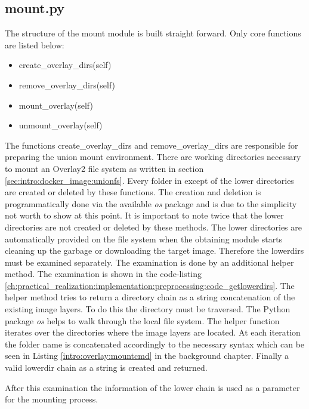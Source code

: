 \subsection{mount.py}	
\label{ch:practical_realization:implementation:mount}
The structure of the mount module is built straight forward. Only core functions are listed below:
\begin{itemize}
\item create\_overlay\_dirs(self)
\item remove\_overlay\_dirs(self)
\item mount\_overlay(self)
\item unmount\_overlay(self)
\end{itemize}
The functions create\_overlay\_dirs and remove\_overlay\_dirs are responsible for preparing the union mount environment. There are working directories necessary to mount an Overlay2 file system as written in section \ref{sec:intro:docker_image:unionfs}.
Every folder in except of the lower directories are created or deleted by these functions. 
The creation and deletion is programmatically done via the available \textit{os} package and is due to the simplicity not worth to show at this point. It is important to note twice that the lower directories are not created or deleted by these methods. 
The lower directories are automatically provided on the file system when the obtaining module starts cleaning up the garbage or downloading the target image.
Therefore the lowerdirs must be examined separately. The examination is done by an additional helper method. 
The examination is shown in the code-listing \ref{ch:practical_realization:implementation:preprocessing:code_getlowerdirs}.
The helper method tries to return a directory chain as a string concatenation of the existing image layers.
To do this the directory must be traversed. The Python package \textit{os} helps to walk through the local file system. The helper function iterates over the directories where the image layers are located.
At each iteration the folder name is concatenated accordingly to the necessary syntax which can be seen in Listing \ref{intro:overlay:mountcmd} in the background chapter. Finally a valid lowerdir chain as a string is created and returned.

After this examination the information of the lower chain is used as a parameter for the mounting process.
